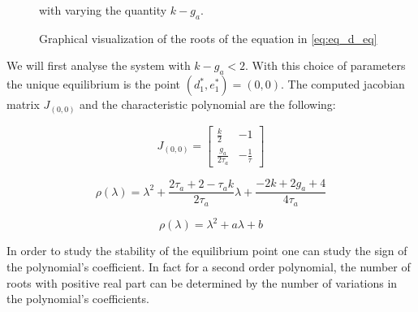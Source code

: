  \begin{figure}[!h]
        \caption{\label{fig:eq2D_adapt} Graphical visualization of the roots of the equation in \eqref{eq:eq_d_eq}} with varying the quantity $k - g_a$.
\end{figure}

We will first analyse the system with $k - g_a < 2$. With this choice of parameters the unique equilibrium is the point $(d_1^*,e_1^*)=(0, 0)$. The computed jacobian matrix $J_{(0,0)}$ and the characteristic polynomial are the following:

\begin{equation}
J_{(0, 0)} = \begin{bmatrix} 
\frac{k}{2} & -1 \\
\frac{g_a}{2\tau_a} & -\frac{1}{\tau}
\end{bmatrix}
\end{equation}

\begin{equation}
\rho(\lambda) = \lambda^2 +  \frac{2\tau_a + 2 - \tau_a k}{2\tau_a} \lambda + \frac{-2k + 2g_a + 4}{4\tau_a}
\end{equation}

\begin{equation}
\rho(\lambda) = \lambda^2 + a\lambda +b
\end{equation}

In order to study the stability of the equilibrium point one can study the sign of the polynomial's coefficient. In fact for a second order polynomial, the number of roots with positive real part can be determined by the number of variations in the polynomial's coefficients.

